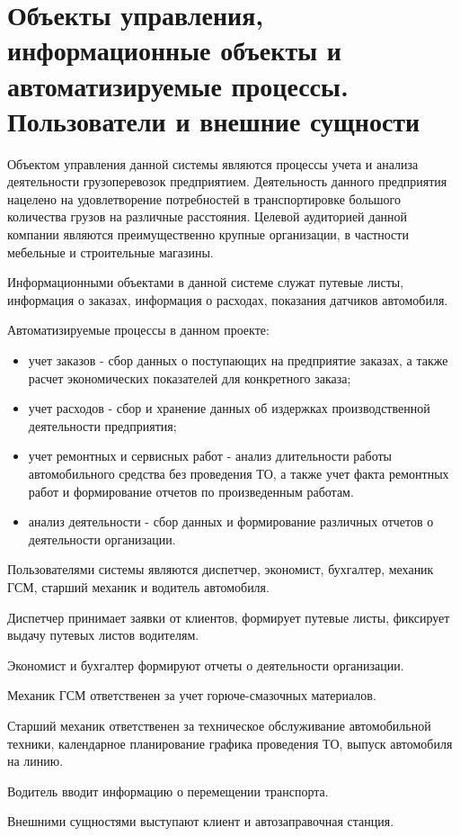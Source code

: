 \documentclass[../nirs.tex]{subfiles}
\begin{document}
\section{Объекты управления, информационные объекты и автоматизируемые процессы.
	Пользователи и внешние сущности}
Объектом управления данной системы являются процессы учета и анализа
деятельности грузоперевозок предприятием. Деятельность данного предприятия
нацелено на удовлетворение потребностей в транспортировке большого количества
грузов на различные расстояния. Целевой аудиторией данной компании являются
преимущественно крупные организации, в частности мебельные и строительные
магазины.

Информационными объектами в данной системе служат путевые листы, информация о
заказах, информация о расходах, показания датчиков автомобиля.

Автоматизируемые процессы в данном проекте:
\begin{itemize}
	\item учет заказов - сбор данных о поступающих на предприятие заказах, а
		также расчет экономических показателей для конкретного заказа;
	\item учет расходов - сбор и хранение данных об издержках производственной
		деятельности предприятия;
	\item учет ремонтных и сервисных работ - анализ длительности работы
		автомобильного средства без проведения ТО, а также учет факта ремонтных
		работ и формирование отчетов по произведенным работам.
	\item анализ деятельности - сбор данных и формирование различных отчетов о
		деятельности организации.
\end{itemize}

Пользователями системы являются диспетчер, экономист, бухгалтер, механик ГСМ,
старший механик и водитель автомобиля.

Диспетчер принимает заявки от клиентов, формирует путевые листы,
фиксирует выдачу путевых листов водителям.

Экономист и бухгалтер формируют отчеты о деятельности организации.

Механик ГСМ ответственен за учет горюче-смазочных материалов.

Старший механик ответственен за техническое обслуживание автомобильной
техники, календарное планирование графика проведения ТО, выпуск
автомобиля на линию.

Водитель вводит информацию о перемещении транспорта.

Внешними сущностями выступают клиент и автозаправочная станция.
\end{document}

